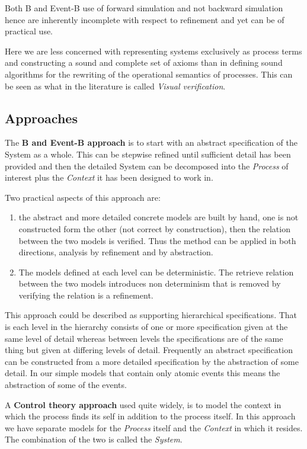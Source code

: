\documentclass[]{article}
\begin{document}
Both B and Event-B  use of forward simulation and not backward simulation  hence are inherently incomplete with respect to refinement and yet  can be of practical use.

Here we are less concerned with representing systems exclusively as process terms and constructing a sound and complete set of axioms  than in defining sound algorithms for the rewriting of the operational semantics of processes. This can be seen as what in the literature is called \emph{Visual verification}.

\subsection{Approaches}
The {\bf B and  Event-B approach } is to start with an abstract specification of the System as a whole. This can be stepwise refined until sufficient detail has been provided and then the detailed System can be decomposed into the \emph{Process} of interest plus the \emph{Context} it has been designed to work in.

Two practical aspects of this approach are:
\begin{enumerate}
\item the abstract and more detailed concrete models are built by hand, one is not constructed form the other (not correct by construction), then the relation between the two models is verified. Thus the method can be applied in both directions, analysis by refinement and by abstraction.
\item The models defined at each level can be deterministic. The retrieve relation between the two models introduces non determinism that is removed by verifying the relation is a refinement.
\end{enumerate}

This approach could be described as supporting hierarchical specifications. That is each level in the hierarchy  consists of one or more specification given at the same level of detail whereas between levels the specifications are of the same thing but given at differing levels of detail. Frequently an abstract specification can be constructed from a more detailed specification by the  abstraction of some detail. In our simple models that contain only atomic events this means the abstraction of some of the events.

A {\bf Control theory approach} used quite widely, is to model the context in which the process finds its self in addition to the process itself.  In this approach we have separate models for  the \emph{Process} itself and the \emph{Context} in which it resides. The combination of the two is called the \emph{System}.
\end{document}
